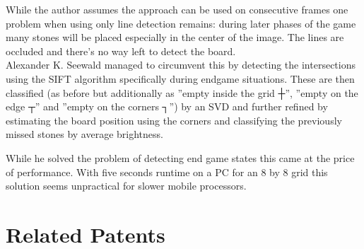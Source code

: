 	While the author assumes the approach can be used on consecutive frames one problem when using only line detection remains: during later phases of the game many stones will be placed especially in the center of the image. The lines are occluded and there's no way left to detect the board.
	\\

	Alexander K. Seewald \cite{seewald2010automatic} managed to circumvent this by detecting the intersections using the SIFT algorithm specifically during endgame situations. These are then classified (as before but additionally as ''empty inside the grid ┼'', ''empty on the edge ┬'' and ''empty on the corners ┐'') by an SVD and further refined by estimating the board position using the corners and classifying the previously missed stones by average brightness.

	While he solved the problem of detecting end game states this came at the price of performance. With five seconds runtime on a PC for an 8 by 8 grid this solution seems unpractical for slower mobile processors.

	\section{Related Patents}

